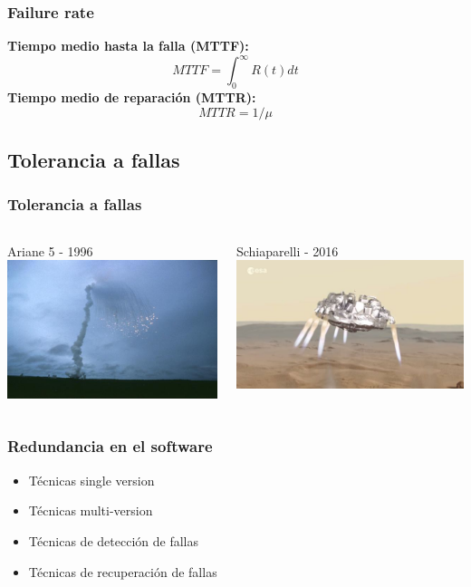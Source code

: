 \begin{frame}
	\frametitle{Failure rate}
    \textbf{Tiempo medio hasta la falla (MTTF):}
    $$ MTTF = \int_{0}^{\infty}{R(t) dt} $$
    \textbf{Tiempo medio de reparación (MTTR):}
    $$ MTTR = 1/\mu $$
\end{frame}

\subsection{Tolerancia a fallas}
\begin{frame}
	\frametitle{Tolerancia a fallas}
	\begin{columns}[T]
		\begin{column}{.5\textwidth}
			\centering
			Ariane 5 - 1996
			\vfill
			\includegraphics[scale=1]{images/ariane5.jpg}
		\end{column}
		\begin{column}{.5\textwidth}
			\centering
			Schiaparelli - 2016
			\vfill
			\includegraphics[scale=0.2]{images/mars.jpg}
		\end{column}
	\end{columns}    
\end{frame}

\begin{frame}
	\frametitle{Redundancia en el software}
	\begin{itemize}
		\item Técnicas single version
		\item Técnicas multi-version
		\item Técnicas de detección de fallas
		\item Técnicas de recuperación de fallas
	\end{itemize}
\end{frame}